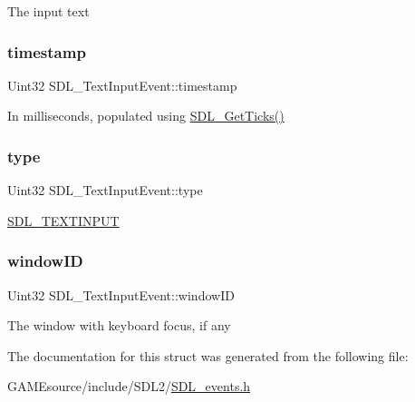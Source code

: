 The input text \mbox{\label{struct_s_d_l___text_input_event_a20b190a96494918690ea7f99187be948}} 
\subsubsection{\texorpdfstring{timestamp}{timestamp}}
{\footnotesize\ttfamily Uint32 S\+D\+L\+\_\+\+Text\+Input\+Event\+::timestamp}

In milliseconds, populated using \mbox{\hyperlink{_s_d_l__timer_8h_a0b9bc71d6287e0ffafdc3419760fe2b3}{S\+D\+L\+\_\+\+Get\+Ticks()}} \mbox{\label{struct_s_d_l___text_input_event_a90576be2ea52e694deff40d0586654f5}} 
\subsubsection{\texorpdfstring{type}{type}}
{\footnotesize\ttfamily Uint32 S\+D\+L\+\_\+\+Text\+Input\+Event\+::type}

\mbox{\hyperlink{_s_d_l__events_8h_a3b589e89be6b35c02e0dd34a55f3fccaa4fa2570088f6b9cbd109ae91b511368f}{S\+D\+L\+\_\+\+T\+E\+X\+T\+I\+N\+P\+UT}} \mbox{\label{struct_s_d_l___text_input_event_aeb4f7a939353990ca40261ffbfbeb3d0}} 
\subsubsection{\texorpdfstring{window\+ID}{windowID}}
{\footnotesize\ttfamily Uint32 S\+D\+L\+\_\+\+Text\+Input\+Event\+::window\+ID}

The window with keyboard focus, if any 

The documentation for this struct was generated from the following file\+:\begin{DoxyCompactItemize}
\item 
G\+A\+M\+Esource/include/\+S\+D\+L2/\mbox{\hyperlink{_s_d_l__events_8h}{S\+D\+L\+\_\+events.\+h}}\end{DoxyCompactItemize}

